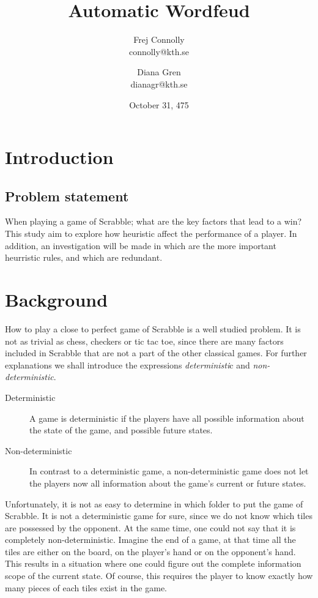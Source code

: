 \documentclass[a4paper, 12pt]{report}
\begin{document}
\title{Automatic Wordfeud}
\date{October 31, 475}
\author{Frej Connolly \\ connolly@kth.se
        \and Diana Gren \\ dianagr@kth.se}

\maketitle
\tableofcontents

\chapter{Introduction}
\section{Problem statement}
When playing a game of Scrabble; what are the key factors that lead to a win? This study aim to explore how heuristic affect the performance of a player. In addition, an investigation will be made in which are the more important heurristic rules, and which are redundant.
\chapter{Background}
How to play a close to perfect game of Scrabble is a well studied problem. It is not as trivial as chess, checkers or tic tac toe, since there are many factors included in Scrabble that are not a part of the other classical games. For further explanations we shall introduce the expressions \emph{deterministi}c and \emph{non-deterministic}. 

\begin{description}
\item[Deterministic] A game is deterministic if the players have all possible information about the state of the game, and possible future states.
\item[Non-deterministic] In contrast to a deterministic game, a non-deterministic game does not let the players now all information about the game's current or future states.
\end{description}

Unfortunately, it is not as easy to determine in which folder to put the game of Scrabble. It is not a deterministic game for sure, since we do not know which tiles are possessed by the opponent. At the same time, one could not say that it is completely non-deterministic. Imagine the end of a game, at that time all the tiles are either on the board, on the player's hand or on the opponent's hand. This results in a situation where one could figure out the complete information scope of the current state. Of course, this requires the player to know exactly how many pieces of each tiles exist in the game.
\end{document}

